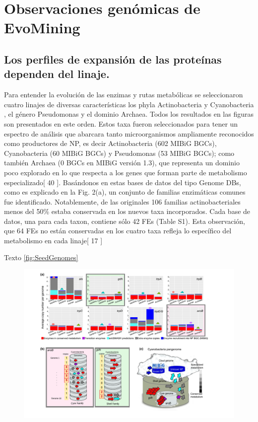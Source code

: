\documentclass[12pt,twoside]{reedthesis}
\begin{document}
  \section{Observaciones genómicas de
  EvoMining}\label{observaciones-genomicas-de-evomining-1}
  
  \subsection{Los perfiles de expansión de las proteínas dependen del
  linaje.}\label{los-perfiles-de-expansion-de-las-proteinas-dependen-del-linaje.-1}
  
  Para entender la evolución de las enzimas y rutas metabólicas se
  seleccionaron cuatro linajes de diversas características los phyla
  Actinobacteria y Cyanobacteria , el género Pseudomonas y el dominio
  Archaea. Todos los resultados en las figuras son presentados en este
  orden. Estos taxa fueron seleccionados para tener un espectro de
  análisis que abarcara tanto microorganismos ampliamente reconocidos como
  productores de NP, es decir Actinobacteria (602 MIBiG BGCs),
  Cyanobacteria (60 MIBiG BGCs) y Pseudomonas (53 MIBiG BGCs); como
  también Archaea (0 BGCs en MIBiG versión 1.3), que representa un dominio
  poco explorado en lo que respecta a los genes que forman parte de
  metabolismo especializado{[} 40 {]}. Basándonos en estas bases de datos
  del tipo Genome DBs, como es explicado en la Fig. 2(a), un conjunto de
  familias enzimáticas comunes fue identificado. Notablemente, de las
  originales 106 familias actinobacteriales menos del 50\% estaba
  conservada en los nuevos taxa incorporados. Cada base de datos, una para
  cada taxon, contiene sólo 42 FEs (Table S1). Esta observación, que 64
  FEs no están conservadas en los cuatro taxa refleja lo específico del
  metabolismo en cada linaje{[} 17 {]}
  
  Texto \autoref{fig:SeedGenomes}
  
  \begin{figure}[h!tbp]
  \centering
  \includegraphics[angle = 0,scale = .5]{chapter2/FigurasPaper/Figure3.pdf}
  \caption[Expansion patterns in 42 conserved families]{\footnotesize{}}
  \label{fig:ExpansionPatterns}
  \end{figure}
  
\end{document}

